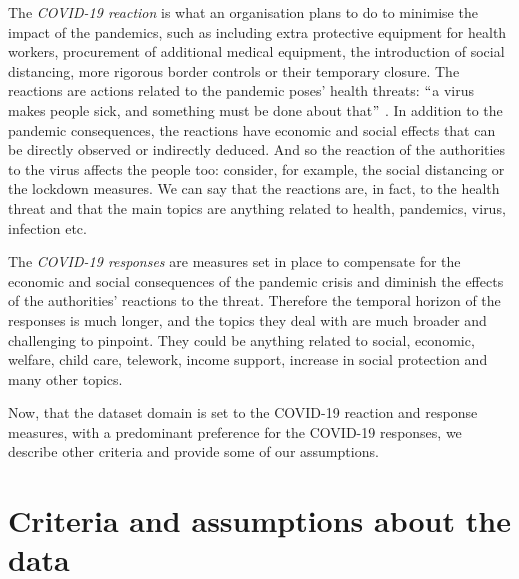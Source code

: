 The \textit{COVID-19 reaction} is what an organisation plans to do to minimise the impact of the pandemics, such as including extra protective equipment for health workers, procurement of additional medical equipment, the introduction of social distancing, more rigorous border controls or their temporary closure. The reactions are actions related to the pandemic poses' health threats: $``$a virus makes people sick, and something must be done about that$"$ . In addition to the pandemic consequences, the reactions have economic and social effects that can be directly observed or indirectly deduced. And so the reaction of the authorities to the virus affects the people too: consider, for example, the social distancing or the lockdown measures. We can say that the reactions are, in fact, to the health threat and that the main topics are anything related to health, pandemics, virus, infection etc. 

The \textit{COVID-19 responses} are measures set in place to compensate for the economic and social consequences of the pandemic crisis and diminish the effects of the authorities' reactions to the threat. Therefore the temporal horizon of the responses is much longer, and the topics they deal with are much broader and challenging to pinpoint. They could be anything related to social, economic, welfare, child care, telework, income support, increase in social protection and many other topics. 

Now, that the dataset domain is set to the COVID-19 reaction and response measures, with a predominant preference for the COVID-19 responses, we describe other criteria and provide some of our assumptions.  

\section{Criteria and assumptions about the data}

